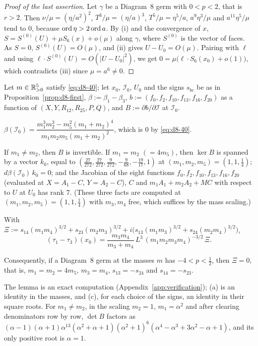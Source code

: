 \begin{proof}[Proof of the last assertion]
Let $\gamma$ be a Diagram~8 germ with $0<p<2$, that is $r>2$.  Then $\nu/\mu=(\eta/a^2)^2$,
$T^3/\mu=(\eta/a)^3$, $T^5/\mu=\eta^5/a$, $a^9\eta^3/\mu$ and $a^{11}\eta^5/\mu$ tend to $0$,
because $\operatorname{ord}\eta>2\operatorname{ord} a$.  By (i) and the convergence of $x$, $S=S^{(0)}(U)+\mu S_6(x)+o(\mu)$
along $\gamma$, where $S^{(0)}$ is the vector of faces.  As $S=0$, $S^{(0)}(U)=O(\mu)$, and (ii)
gives $U-U_0=O(\mu)$.  Pairing with $\ell$ and using $\ell\cdot S^{(0)}(U)=O(|U-U_0|^2)$, we get
$0=\mu\bigl(\ell\cdot S_6(x_0)+o(1)\bigr)$, which contradicts (iii) since $\mu=a^6\ne0$.
\end{proof}

\begin{lemma}\label{lem:d8-kappa}
Let $m\in\mathbb{R}_{>0}^5$ satisfy \eqref{eq:d8-40}; let $x_0$, $\mathcal I_0$, $U_0$ and the signs
$s_{bc}$ be as in Proposition~\ref{prop:d8-first}, $\beta:=\beta_1-\beta_3$,
$b:=(f_0,f_2,f_{10},f_{13},f_{16},f_{20})$ as a function of
$(X,Y,R_{12},R_{25},P,Q)$, and $B:=\partial b/\partial\mathcal I$ at $\mathcal I_0$.
\begin{alphalist}
\item $\beta(\mathcal I_0)=\dfrac{m_1^3m_2^3-m_5^2(m_1+m_2)^4}{m_1m_2m_5(m_1+m_2)^2}$, which is
$0$ by \eqref{eq:d8-40}.
\item If $m_1\ne m_2$, then $B$ is invertible.  If $m_1=m_2$ $(=4m_5)$, then $\ker B$ is spanned
by a vector $k_0$, equal to $(\frac{27}{272},\frac{27}{272},\frac9{272},-\frac9{68},-\frac{19}{17},1)$
at $(m_1,m_2,m_5)=(1,1,\frac14)$; $d\beta(\mathcal I_0)\,k_0=0$; and the Jacobian of the eight
functions $f_0,f_2,f_{10},f_{13},f_{16},f_{20}$ (evaluated at $X=A_1-C$, $Y=A_2-C$), $C$ and
$m_1A_1+m_2A_2+MC$ with respect to $U$ at $U_0$ has rank $7$.  (These three facts are computed
at $(m_1,m_2,m_5)=(1,1,\frac14)$ with $m_3,m_4$ free, which suffices by the mass scaling.)
\item With $\Xi:=s_{14}(m_1m_4)^{3/2}+s_{23}(m_2m_3)^{3/2}
+i\bigl(s_{13}(m_1m_3)^{3/2}+s_{24}(m_2m_4)^{3/2}\bigr)$,
\[
  (\tau_1-\tau_3)(x_0)=\frac{m_3m_4}{m_3+m_4}\,L^3\,(m_1m_2m_3m_4)^{-3/2}\,\Xi .
\]
\end{alphalist}
Consequently, if a Diagram~8 germ at the masses $m$ has $-4<p<\frac12$, then $\Xi=0$, that is,
$m_1=m_2=4m_5$, $m_3=m_4$, $s_{13}=-s_{24}$ and $s_{14}=-s_{23}$.
\end{lemma}
The lemma is an exact computation (Appendix~\ref{app:verification}); (a) is an identity in the
masses, and (c), for each choice of the signs, an identity in their square roots.  For
$m_1\ne m_2$, in the scaling $m_2=1$, $m_1=\alpha^2$ and after clearing denominators row by
row, $\det B$ factors as $(\alpha-1)(\alpha+1)\alpha^{13}(\alpha^2+\alpha+1)(\alpha^2+1)^6
(\alpha^4-\alpha^3+3\alpha^2-\alpha+1)$, and its only positive root is $\alpha=1$.

